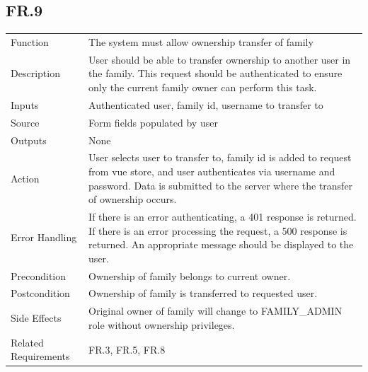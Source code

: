 \documentclass[12pt]{article}
\begin{document}
    \subsection*{FR.9}
    \begin{center}
        \begin{tabular}{| p{10em} p{26em} |}
        \hline
         Function & The system must allow ownership transfer of family\\
         Description & User should be able to transfer ownership to another user in the family. This request should be authenticated to ensure only the current family owner can perform this task.\\
         Inputs & Authenticated user, family id, username to transfer to\\
         Source & Form fields populated by user\\
         Outputs & None\\
         Action & User selects user to transfer to, family id is added to request from vue store, and user authenticates via username and password. Data is submitted to the server where the transfer of ownership occurs.\\
         Error Handling & If there is an error authenticating, a 401 response is returned. If there is an error processing the request, a 500 response is returned. An appropriate message should be displayed to the user.\\
         Precondition & Ownership of family belongs to current owner.\\
         Postcondition & Ownership of family is transferred to requested user.\\
         Side Effects & Original owner of family will change to FAMILY\_ADMIN role without ownership privileges.\\
         Related Requirements & FR.3, FR.5, FR.8\\
         \hline
        \end{tabular}
    \end{center}
\end{document}
